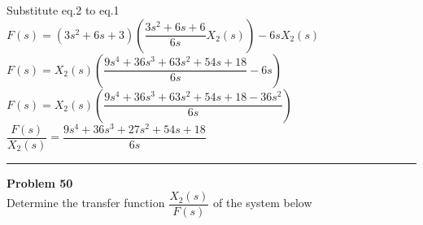 \documentclass[11pt,letterpaper]{article}
\begin{document}
Substitute eq.2 to eq.1\\

$F(s)=(3s^2+6s+3)\left(\dfrac{3s^2+6s+6}{6s}X_2(s)\right)-6sX_2(s)$\\

$F(s)=X_2(s)\left(\dfrac{9s^4+36s^3+63s^2+54s+18}{6s}-6s\right)$\\

$F(s)=X_2(s)\left(\dfrac{9s^4+36s^3+63s^2+54s+18-36s^2}{6s}\right)$\\

$\dfrac{F(s)}{X_2(s)}=\dfrac{9s^4+36s^3+27s^2+54s+18}{6s}$\\


\clearpage
\rule{\textwidth}{1pt}
\textbf{Problem 50}\\
Determine the transfer function $\dfrac{X_2(s)}{F(s)}$ of the system below\\
\end{document}
